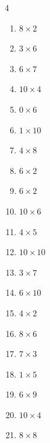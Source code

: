 \begin{multicols}{4}
\begin{enumerate}
  \item $8\times 2$
        \phantom{$=16$}

  \item $3\times 6$
        \phantom{$=18$}

  \item $6\times 7$
        \phantom{$=42$}

  \item $10\times 4$
        \phantom{$=40$}

  \item $0\times 6$
        \phantom{$=0$}

  \item $1\times 10$
        \phantom{$=10$}

  \item $4\times 8$
        \phantom{$=32$}

  \item $6\times 2$
        \phantom{$=12$}

  \item $6\times 2$
        \phantom{$=12$}

  \item $10\times 6$
        \phantom{$=60$}

  \item $4\times 5$
        \phantom{$=20$}

  \item $10\times 10$
        \phantom{$=100$}

  \item $3\times 7$
        \phantom{$=21$}

  \item $6\times 10$
        \phantom{$=60$}

  \item $4\times 2$
        \phantom{$=8$}

  \item $8\times 6$
        \phantom{$=48$}

  \item $7\times 3$
        \phantom{$=21$}

  \item $1\times 5$
        \phantom{$=5$}

  \item $6\times 9$
        \phantom{$=54$}

  \item $10\times 4$
        \phantom{$=40$}

  \item $8\times 8$
        \phantom{$=64$}


\end{enumerate}
\end{multicols}
